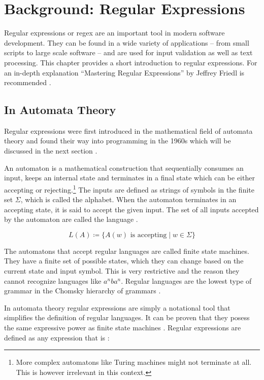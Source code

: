 
\chapter{Background: Regular Expressions} \label{chapter:intro}

Regular expressions or regex are an important tool in modern software development. They can be found in a wide variety of applications -- from small scripts to large scale software -- and are used for input validation as well as text processing. This chapter provides a short introduction to regular expressions. For an in-depth explanation \enquote{Mastering Regular Expressions} by Jeffrey Friedl is recommended \cite{MasteringRegex}.

\section{In Automata Theory} \label{sec:regexInAutomata}

Regular expressions were first introduced in the mathematical field of automata theory and found their way into programming in the 1960s which will be discussed in the next section \cite{RegularExpressionSearchAlgorithm}. 

An automaton is a mathematical construction that sequentially consumes an input, keeps an internal state and terminates in a final state which can be either accepting or rejecting.\footnote{More complex automatons like Turing machines might not terminate at all. This is however irrelevant in this context.} The inputs are defined as strings of symbols in the finite set $\Sigma$, which is called the alphabet. When the automaton terminates in an accepting state, it is said to accept the given input. The set of all inputs accepted by the automaton are called the language \cite[13]{TheoryOfComputation}.

\begin{equation*}
L(A) \coloneqq \{ A(w)\text{ is accepting} \mid w \in \Sigma \}
\end{equation*}

The automatons that accept regular languages are called finite state machines. They have a finite set of possible states, which they can change based on the current state and input symbol. This is very restrictive and the reason they cannot recognize languages like $a^nba^n$. Regular languages are the lowest type of grammar in the Chomsky hierarchy of grammars \cite{ChomskyCertainFormalPropertiesGrammars}. 

In automata theory regular expressions are simply a notational tool that simplifies the definition of regular languages. It can be proven that they posess the same expressive power as finite state machines \cite{AutomataTheoryLanguagesAndComputation}. Regular expressions are defined as any expression that is \cite[p.~46]{TheoryOfComputation}:

